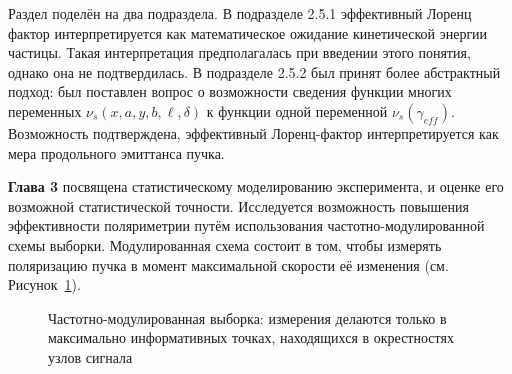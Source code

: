 Раздел поделён на два подраздела. В подразделе 2.5.1 эффективный Лоренц фактор интерпретируется как 
математическое ожидание кинетической энергии частицы. Такая интерпретация предполагалась при введении
этого понятия, однако она не подтвердилась. В подразделе 2.5.2 был принят более абстрактный подход: 
был поставлен вопрос о возможности сведения функции многих переменных $\nu_s(x,a,y,b,\ell,\delta)$ 
к функции одной переменной $\nu_s(\gamma_{eff})$. Возможность подтверждена, эффективный Лоренц-фактор
интерпретируется как мера продольного эмиттанса пучка.

\textbf{Глава 3} посвящена статистическому моделированию эксперимента, 
и оценке его возможной статистической точности. Исследуется возможность повышения эффективности
поляриметрии путём использования частотно-модулированной схемы выборки. Модулированная схема 
состоит в том, чтобы измерять поляризацию пучка в момент максимальной скорости её изменения 
(см. Рисунок~\ref{fig:modulated_sampling}).

\begin{figure}[H]\centering
	\caption{Частотно-модулированная выборка: измерения делаются только в максимально информативных точках,
		находящихся в окрестностях узлов сигнала\label{fig:modulated_sampling}}
\end{figure}


